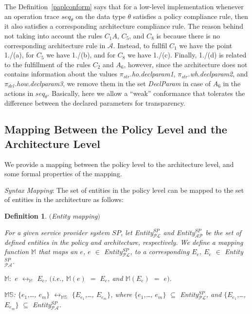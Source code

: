 \documentclass[a4paper]{article}
\newtheorem{ttd}{Definition}
\begin{document}
The Definition~\ref{paplconform} says that for a low-level implementation whenever an operation trace $seq_{\theta}$ on the data type $\theta$ satisfies a policy compliance rule, then it also satisfies a corresponding architecture compliance rule. The reason behind not taking into account the rules $C_1A$, $C_5$, and $C_8$ is because there is no corresponding architecture rule in $\mathcal{A}$. Instead, to fullfil $C_1$ we have the point 1./(a), for      $C_5$ we have 1./(b), and for $C_8$ we have 1./(c).  Finally, 1./(d) is related to the fulfillment of the rules $C_2$ and $A_6$, however, since the architecture does not contains information about the values $\pi_{str}$.\textit{ho}.\textit{declparam1}, $\pi_{str}$.\textit{wh}.\textit{declparam2}, and $\pi_{del}$.\textit{how}.\textit{declparam3}, we remove them in the set \textit{DeclParam} in case of $A_6$ in the actions in $seq_{\theta}$.  Basically, here we allow a ``weak'' conformance that tolerates the difference between the declared parameters for transparency.  

\subsection{Mapping Between the Policy Level and the Architecture Level}
\label{mapping}

We provide a mapping between the policy level to the architecture level, and some formal properties of the mapping. 

\textit{Syntax Mapping}: The set of entities in the policy level can be mapped to the set of entities in the architecture as follows: 

\begin{ttd} $($Entity mapping$)$

\noindent For a given service provider system $SP$, let \textit{Entity}$^{SP}_{\mathcal{P}\mathcal{L}}$  and  \textit{Entity}$^{SP}_{\mathcal{A}\mathcal{P}}$ be the set of defined entities in the policy and architecture, respectively.  
We define a mapping function $\mathbb{M}$ that maps an $e$, $e$ $\in$ \textit{Entity}$^{SP}_{\mathcal{P}\mathcal{L}}$, to a corresponding $E_e$, $E_e$ $\in$ \textit{Entity}$^{SP}_{\mathcal{P}\mathcal{A}}$.       

\begin{center}
$\mathbb{M}$$:$ $e$  $\leftrightarrow_{\mathbb{M}}$ $E_e$, $($i.e., $\mathbb{M}(e)$ $=$ $E_e$, and  $\mathbb{M}(E_e)$ $=$ $e$$)$.

$\mathbb{M}\mathbb{S}$: $\{$$e_1$,\dots, $e_m$$\}$  $\leftrightarrow_{\mathbb{M}\mathbb{S}}$  $\{$$E_{e_1}$,\dots, $E_{e_m}$$\}$, where $\{$$e_1$,\dots, $e_m$$\}$ $\subseteq$ \textit{Entity}$^{SP}_{\mathcal{P}\mathcal{L}}$, and $\{$$E_{e_1}$,\dots, $E_{e_m}$$\}$ $\subseteq$ \textit{Entity}$^{SP}_{\mathcal{P}\mathcal{A}}$. 
\end{center}

\end{ttd}
\end{document}
